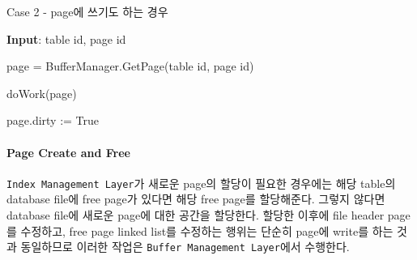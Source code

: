 \documentclass[main.tex]{subfiles}
\begin{document}
\begin{algorithm}
	\caption{Case 2 - page에 쓰기도 하는 경우}
	
	\hspace*{8pt} \textbf{Input}: table id, page id\\
	
	\begin{algorithmic}
		\State page = BufferManager.GetPage(table id, page id)
		
		\State doWork(page)
		
		\State page.dirty := True
	\end{algorithmic}
\end{algorithm}


\paragraph{Page Create and Free}
\texttt{Index Management Layer}가 새로운 page의 할당이 필요한 경우에는 해당 table의 database file에 free page가 있다면 해당 free page를 할당해준다. 그렇지 않다면 database file에 새로운 page에 대한 공간을 할당한다. 할당한 이후에 file header page를 수정하고, free page linked list를 수정하는 행위는 단순히 page에 write를 하는 것과 동일하므로 이러한 작업은 \texttt{Buffer Management Layer}에서 수행한다.
\end{document}
